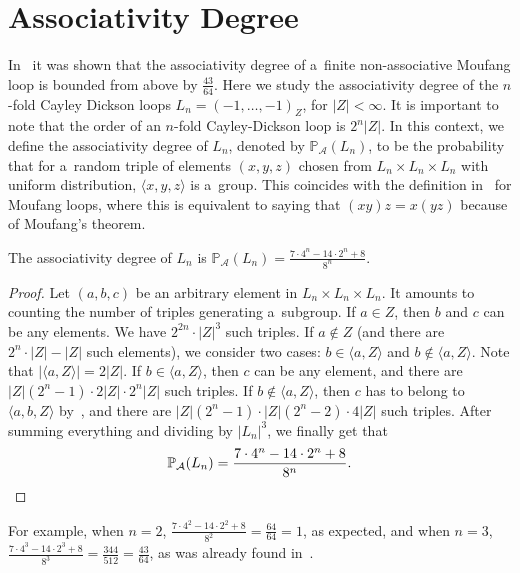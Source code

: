 \documentclass{jonasart}
\begin{document}
	\section{Associativity Degree}

	In~\cite{Levin2025AssociativeMoufang} it was shown that the associativity degree of a~finite non-associative Moufang loop is bounded from above by $\frac{43}{64}$. Here we study the associativity degree of the $n$-fold Cayley Dickson loops $L_n =(-1,\dots,-1)_Z$, for $|Z| < \infty$. It is important to note that the order of an $n$-fold Cayley-Dickson loop is $2^n |Z|$. In this context, we define the associativity degree of $L_n$, denoted by $\mathbb{P}_{\mathcal{A}}(L_n )$, to be the probability that for a~random triple of elements $(x,y,z)$ chosen from $L_n \times L_n \times L_n$ with uniform distribution, $\langle x,y,z \rangle $ is a~group. This coincides with the definition in~\cite{Levin2025AssociativeMoufang} for Moufang loops, where this is equivalent to saying that $(xy)z=x(yz)$ because of Moufang's theorem.

	\begin{theorem}
		The associativity degree of $L_n$ is $\mathbb{P}_\mathcal{A}(L_n ) = \frac{7\cdot 4^n -14 \cdot 2^n +8}{8^n}$.
	\end{theorem}

	\begin{proof}
		Let $(a,b,c)$ be an arbitrary element in $L_n \times L_n \times L_n$. It amounts to counting the number of triples generating a~subgroup. If $a \in Z$, then $b$ and $c$ can be any elements. We have $2^{2n}\cdot |Z|^3$ such triples. If $a \not \in Z$ (and there are $2^n\cdot |Z|-|Z|$ such elements), we consider two cases: $b \in \langle a, Z \rangle$ and $b \not \in \langle a, Z \rangle$. Note that $|\langle a, Z \rangle| = 2|Z|$. If $b\in \langle a, Z \rangle$, then $c$ can be any element, and there are $|Z|(2^n -1)\cdot 2|Z| \cdot 2^n |Z|$ such triples. If $b \not \in \langle a, Z \rangle$, then $c$ has to belong to $\langle a,b, Z \rangle$ by~\cite[Lemma 7]{Kirshtein:2014}, and there are $|Z|(2^n -1)\cdot |Z|(2^n -2) \cdot 4|Z|$ such triples. After summing everything and dividing by $|L_n |^3$, we finally get that 
        \[
            \mathbb{P}_\mathcal{A}(L_n)
            = \frac{7\cdot 4^n -14 \cdot 2^n +8}{8^n}.
        \qedhere
        \]
	\end{proof}

	For example, when $n=2$, $\frac{7\cdot 4^2 -14 \cdot 2^2 +8}{8^2}=\frac{64}{64}=1$, as expected, and when $n=3$, $\frac{7\cdot 4^3 -14 \cdot 2^3 +8}{8^3}=\frac{344}{512}=\frac{43}{64}$, as was already found in~\cite{Levin2025AssociativeMoufang}.
\end{document}
